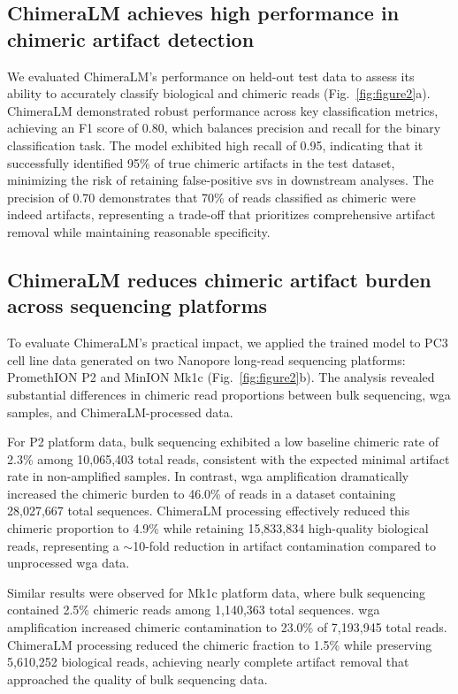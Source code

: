 \documentclass[pdflatex,sn-nature]{sn-jnl}%
\theoremstyle{thmstyleone}%
\theoremstyle{thmstyletwo}%
\theoremstyle{thmstylethree}%
\begin{document}
\subsection*{ChimeraLM achieves high performance in chimeric artifact detection}

We evaluated ChimeraLM's performance on held-out test data to assess its ability to accurately classify biological and chimeric reads (Fig.~\ref{fig:figure2}a).
ChimeraLM demonstrated robust performance across key classification metrics, achieving an F1 score of 0.80, which balances precision and recall for the binary classification task.
The model exhibited high recall of 0.95, indicating that it successfully identified 95\% of true chimeric artifacts in the test dataset, minimizing the risk of retaining false-positive \glspl{sv} in downstream analyses.
The precision of 0.70 demonstrates that 70\% of reads classified as chimeric were indeed artifacts, representing a trade-off that prioritizes comprehensive artifact removal while maintaining reasonable specificity.

\subsection*{ChimeraLM reduces chimeric artifact burden across sequencing platforms}

To evaluate ChimeraLM's practical impact, we applied the trained model to PC3 cell line data generated on two Nanopore long-read sequencing platforms: PromethION P2 and MinION Mk1c (Fig.~\ref{fig:figure2}b).
The analysis revealed substantial differences in chimeric read proportions between bulk sequencing, \gls{wga} samples, and ChimeraLM-processed data.

For P2 platform data, bulk sequencing exhibited a low baseline chimeric rate of 2.3\% among 10,065,403 total reads, consistent with the expected minimal artifact rate in non-amplified samples.
In contrast, \gls{wga} amplification dramatically increased the chimeric burden to 46.0\% of reads in a dataset containing 28,027,667 total sequences.
ChimeraLM processing effectively reduced this chimeric proportion to 4.9\% while retaining 15,833,834 high-quality biological reads, representing a $\sim$10-fold reduction in artifact contamination compared to unprocessed \gls{wga} data.

Similar results were observed for Mk1c platform data, where bulk sequencing contained 2.5\% chimeric reads among 1,140,363 total sequences.
\gls{wga} amplification increased chimeric contamination to 23.0\% of 7,193,945 total reads.
ChimeraLM processing reduced the chimeric fraction to 1.5\% while preserving 5,610,252 biological reads, achieving nearly complete artifact removal that approached the quality of bulk sequencing data.
\end{document}

